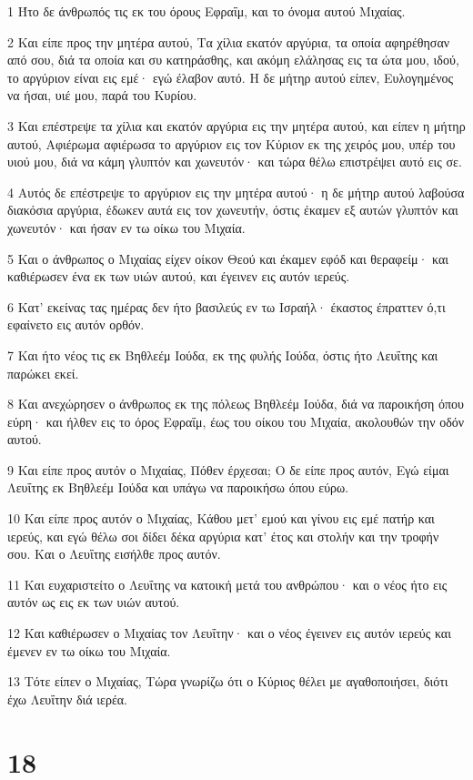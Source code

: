 \par 1 Ήτο δε άνθρωπός τις εκ του όρους Εφραΐμ, και το όνομα αυτού Μιχαίας.
\par 2 Και είπε προς την μητέρα αυτού, Τα χίλια εκατόν αργύρια, τα οποία αφηρέθησαν από σου, διά τα οποία και συ κατηράσθης, και ακόμη ελάλησας εις τα ώτα μου, ιδού, το αργύριον είναι εις εμέ· εγώ έλαβον αυτό. Η δε μήτηρ αυτού είπεν, Ευλογημένος να ήσαι, υιέ μου, παρά του Κυρίου.
\par 3 Και επέστρεψε τα χίλια και εκατόν αργύρια εις την μητέρα αυτού, και είπεν η μήτηρ αυτού, Αφιέρωμα αφιέρωσα το αργύριον εις τον Κύριον εκ της χειρός μου, υπέρ του υιού μου, διά να κάμη γλυπτόν και χωνευτόν· και τώρα θέλω επιστρέψει αυτό εις σε.
\par 4 Αυτός δε επέστρεψε το αργύριον εις την μητέρα αυτού· η δε μήτηρ αυτού λαβούσα διακόσια αργύρια, έδωκεν αυτά εις τον χωνευτήν, όστις έκαμεν εξ αυτών γλυπτόν και χωνευτόν· και ήσαν εν τω οίκω του Μιχαία.
\par 5 Και ο άνθρωπος ο Μιχαίας είχεν οίκον Θεού και έκαμεν εφόδ και θεραφείμ· και καθιέρωσεν ένα εκ των υιών αυτού, και έγεινεν εις αυτόν ιερεύς.
\par 6 Κατ' εκείνας τας ημέρας δεν ήτο βασιλεύς εν τω Ισραήλ· έκαστος έπραττεν ό,τι εφαίνετο εις αυτόν ορθόν.
\par 7 Και ήτο νέος τις εκ Βηθλεέμ Ιούδα, εκ της φυλής Ιούδα, όστις ήτο Λευΐτης και παρώκει εκεί.
\par 8 Και ανεχώρησεν ο άνθρωπος εκ της πόλεως Βηθλεέμ Ιούδα, διά να παροικήση όπου εύρη· και ήλθεν εις το όρος Εφραΐμ, έως του οίκου του Μιχαία, ακολουθών την οδόν αυτού.
\par 9 Και είπε προς αυτόν ο Μιχαίας, Πόθεν έρχεσαι; Ο δε είπε προς αυτόν, Εγώ είμαι Λευΐτης εκ Βηθλεέμ Ιούδα και υπάγω να παροικήσω όπου εύρω.
\par 10 Και είπε προς αυτόν ο Μιχαίας, Κάθου μετ' εμού και γίνου εις εμέ πατήρ και ιερεύς, και εγώ θέλω σοι δίδει δέκα αργύρια κατ' έτος και στολήν και την τροφήν σου. Και ο Λευΐτης εισήλθε προς αυτόν.
\par 11 Και ευχαριστείτο ο Λευΐτης να κατοική μετά του ανθρώπου· και ο νέος ήτο εις αυτόν ως εις εκ των υιών αυτού.
\par 12 Και καθιέρωσεν ο Μιχαίας τον Λευΐτην· και ο νέος έγεινεν εις αυτόν ιερεύς και έμενεν εν τω οίκω του Μιχαία.
\par 13 Τότε είπεν ο Μιχαίας, Τώρα γνωρίζω ότι ο Κύριος θέλει με αγαθοποιήσει, διότι έχω Λευΐτην διά ιερέα.

\chapter{18}

